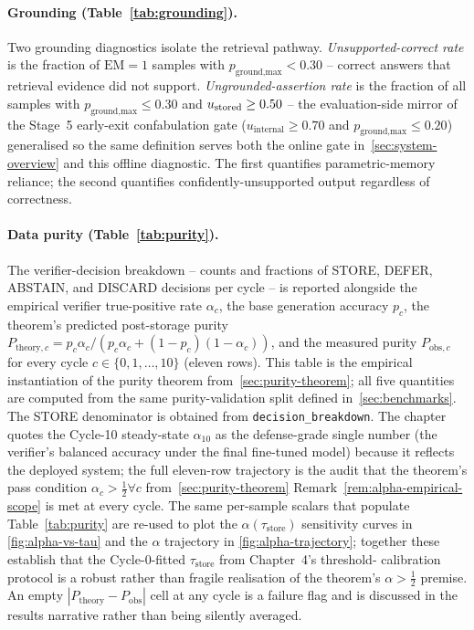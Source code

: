 \paragraph{Grounding (Table~\ref{tab:grounding}).}
Two grounding diagnostics isolate the retrieval pathway.
\emph{Unsupported-correct rate} is the fraction of
$\mathrm{EM}=1$ samples with $p_{\text{ground,max}} < 0.30$ -- correct
answers that retrieval evidence did not support.
\emph{Ungrounded-assertion rate} is the fraction of all samples with
$p_{\text{ground,max}} \leq 0.30$ and $u_{\text{stored}} \geq 0.50$ -- the
evaluation-side mirror of the Stage~5 early-exit confabulation gate
($u_\text{internal} \geq 0.70$ and
$p_{\text{ground,max}} \leq 0.20$) generalised so the same definition
serves both the online gate in~\cref{sec:system-overview} and
this offline diagnostic. The first quantifies parametric-memory
reliance; the second quantifies confidently-unsupported output
regardless of correctness.

\paragraph{Data purity (Table~\ref{tab:purity}).}
The verifier-decision breakdown -- counts and fractions of
\textsc{STORE}, \textsc{DEFER}, \textsc{ABSTAIN}, and
\textsc{DISCARD} decisions per cycle -- is reported alongside the
empirical verifier true-positive rate $\alpha_c$, the base generation
accuracy $p_c$, the theorem's predicted post-storage purity
$P_{\text{theory},c} = p_c\alpha_c / (p_c\alpha_c + (1-p_c)(1-\alpha_c))$,
and the measured purity $P_{\text{obs},c}$ for every cycle $c \in
\{0, 1, \ldots, 10\}$ (eleven rows). This table is the empirical
instantiation of the purity theorem from~\cref{sec:purity-theorem};
all five quantities are computed from the same purity-validation split
defined in~\cref{sec:benchmarks}. The \textsc{STORE} denominator is
obtained from \texttt{decision\_breakdown}. The chapter quotes the
Cycle-10 steady-state $\alpha_{10}$ as the defense-grade single
number (the verifier's balanced accuracy under the final
fine-tuned model) because it reflects the deployed system; the full
eleven-row trajectory is the audit that the theorem's pass condition
$\alpha_c > \tfrac{1}{2} \forall c$ from~\cref{sec:purity-theorem}
Remark~\ref{rem:alpha-empirical-scope} is met at every cycle.
The same per-sample scalars that populate Table~\ref{tab:purity}
are re-used to plot the $\alpha(\tau_{\text{store}})$ sensitivity
curves in \cref{fig:alpha-vs-tau} and the $\alpha$ trajectory in
\cref{fig:alpha-trajectory}; together these establish that the
Cycle-0-fitted $\tau_{\text{store}}$ from Chapter~4's threshold-
calibration protocol is a robust rather than fragile realisation of
the theorem's $\alpha > \tfrac{1}{2}$ premise. An
empty $|P_\text{theory}-P_\text{obs}|$ cell at any cycle is a
failure flag and is discussed in the results narrative rather than
being silently averaged.


